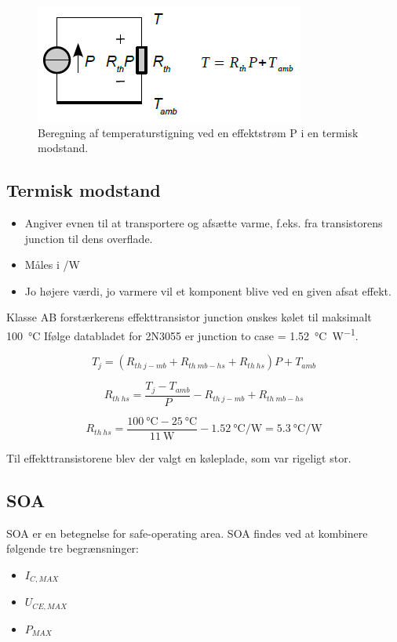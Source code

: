 \documentclass[danish]{article}
\begin{document}
\begin{figure} [H]
	\centering
	\includegraphics[width=0.65\linewidth]{graphics/ohmslovanalogi}
	\caption{Beregning af temperaturstigning ved en effektstrøm P i en termisk modstand.}
	\label{fig:ohmslovanalogi}
\end{figure}

\subsection{Termisk modstand}
\begin{itemize}
	\item Angiver evnen til at transportere og afsætte varme, f.eks. fra transistorens junction til dens overflade.
	\item Måles i \SIUnitSymbolCelsius /\si{\watt}
	\item Jo højere værdi, jo varmere vil et komponent blive ved en given afsat effekt.
\end{itemize}

Klasse AB forstærkerens effekttransistor junction ønskes kølet til maksimalt \SI{100}{\degreeCelsius}
Ifølge databladet for 2N3055 er junction to case = \SI{1.52}{\degreeCelsius\per\watt}.

\begin{equation}
T_j = (R_{th\:j-mb} + R_{th\: mb-hs} + R_{th\: hs})P + T_{amb}
\end{equation}

\begin{equation}
R_{th\: hs} = \dfrac{T_j-T_{amb}}{P}-R_{th\:j-mb} + R_{th\: mb-hs}
\end{equation}

\begin{equation}
R_{th\: hs} = \dfrac{\SI{100}{\degreeCelsius}-\SI{25}{\degreeCelsius}}{\SI{11}{\watt}}-\SI{1.52}{\degreeCelsius\per\watt} = \SI{5.3}{\degreeCelsius\per\watt}
\end{equation}

Til effekttransistorene blev der valgt en køleplade, som var rigeligt stor.

\subsection{SOA}
SOA er en betegnelse for safe-operating area.
SOA findes ved at kombinere følgende tre begrænsninger:
\begin{itemize}
	\item $I_{C,MAX}$
	\item  $U_{CE,MAX}$
	\item  $P_{MAX}$
\end{itemize}
\end{document}
